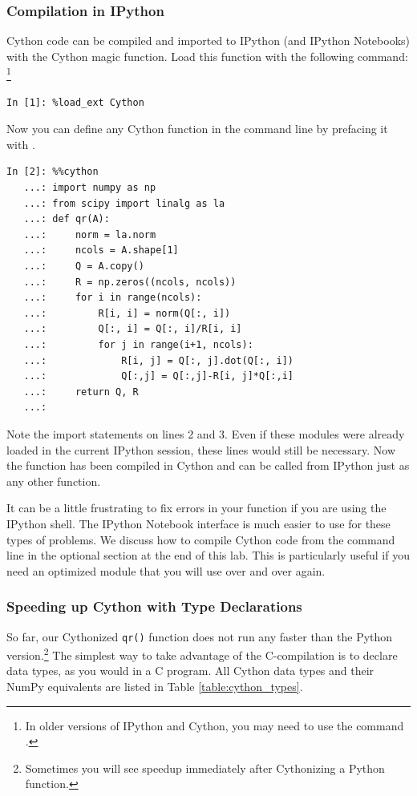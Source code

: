 \subsubsection*{Compilation in IPython}
Cython code can be compiled and imported to IPython (and IPython Notebooks) with the Cython magic function.
Load this function with the following command:
\footnote{In older versions of IPython and Cython, you may need to use the command .}
\begin{lstlisting}
In [1]: %load_ext Cython
\end{lstlisting}
Now you can define any Cython function in the command line by prefacing it with .
\begin{lstlisting}
In [2]: %%cython
   ...: import numpy as np
   ...: from scipy import linalg as la
   ...: def qr(A):
   ...:     norm = la.norm
   ...:     ncols = A.shape[1]
   ...:     Q = A.copy()
   ...:     R = np.zeros((ncols, ncols))
   ...:     for i in range(ncols):
   ...:         R[i, i] = norm(Q[:, i])
   ...:         Q[:, i] = Q[:, i]/R[i, i]
   ...:         for j in range(i+1, ncols):
   ...:             R[i, j] = Q[:, j].dot(Q[:, i])
   ...:             Q[:,j] = Q[:,j]-R[i, j]*Q[:,i]
   ...:     return Q, R
   ...:
\end{lstlisting}
Note the import statements on lines 2 and 3. Even if these modules were already loaded in the current IPython session, these lines would still be necessary. Now the  function has been compiled in Cython and can be called from IPython just as any other function. 

It can be a little frustrating to fix errors in your function if you are using the IPython shell. The IPython Notebook interface is much easier to use for these types of problems.
We discuss how to compile Cython code from the command line in the optional section at the end of this lab. This is particularly useful if you need an optimized module that you will use over and over again.

\subsubsection*{Speeding up Cython with Type Declarations}
So far, our Cythonized \texttt{qr()} function does not run any faster than the Python version.\footnote{Sometimes you will see speedup immediately after Cythonizing a Python function.}
The simplest way to take advantage of the C-compilation is to declare data types, as you would in a C program.
All Cython data types and their NumPy equivalents are listed in Table \ref{table:cython_types}.

